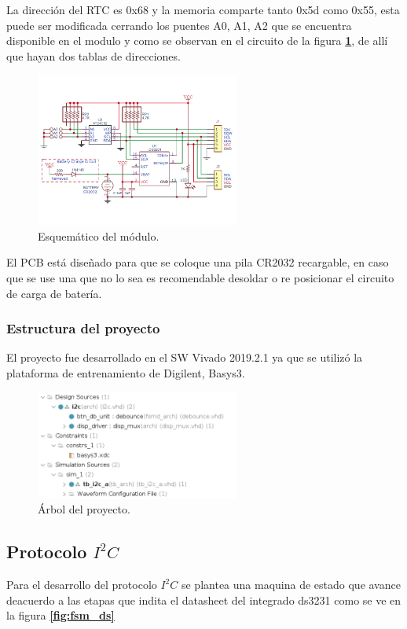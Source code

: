 \documentclass[11pt, a4paper]{article}
\begin{document}
		La dirección del RTC es 0x68 y la memoria comparte tanto 0x5d como 0x55, esta puede ser modificada cerrando los puentes A0, A1, A2 que se encuentra disponible en el modulo y como se observan en el circuito de la figura \textcolor{blue}{\textbf{\ref{fig:ds3231_sch}}}, de allí que hayan dos tablas de direcciones. 

		\begin{figure}[H]
			\centering
			\includegraphics[width=0.6\textwidth]{Imagenes/ds3231-sch.png}
			\caption{Esquemático del módulo.}
			\label{fig:ds3231_sch}
		\end{figure} 

		El PCB está diseñado para que se coloque una pila CR2032 recargable, en caso que se use una que no lo sea es recomendable desoldar o re posicionar el circuito de carga de batería.

	\subsubsection{Estructura del proyecto}
		El proyecto fue desarrollado en el SW Vivado 2019.2.1 ya que se utilizó la plataforma de entrenamiento de Digilent, Basys3.

		\begin{figure}[H]
			\centering
			\includegraphics[width=0.6\textwidth]{Imagenes/proy-tree.png}
			\caption{Árbol del proyecto.}
			\label{fig:pry-tree}
		\end{figure} 
	
		\subsection{Protocolo $I^{2}C$}
		Para el desarrollo del protocolo $I^{2}C$ se plantea una maquina de estado que avance deacuerdo a las etapas que indita el datasheet del integrado ds3231 como se ve en la figura \textcolor{blue}{\textbf{\ref{fig:fsm_ds}}}
						
\end{document}
